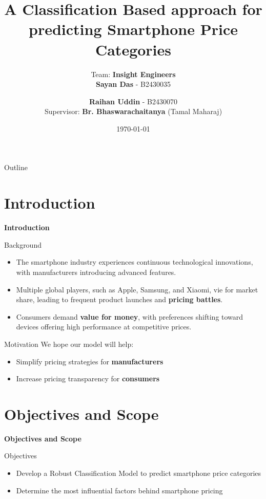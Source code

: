 \documentclass[14pt, aspectratio=169]{beamer}
\title{A Classification Based approach for predicting Smartphone Price Categories}
\author{Team: \textbf{Insight Engineers} \\  \textbf{Sayan Das} - B2430035 \and \textbf{Raihan Uddin} - B2430070 \\ Supervisor: \textbf{Br. Bhaswarachaitanya} (Tamal Maharaj)}
\date{\today}
\begin{document}
\maketitle

\begin{frame}{Outline}
  \tableofcontents
\end{frame}



\section{Introduction}
\begin{frame}{}
  \Huge
  \centering
  \textbf{Introduction}
  \normalsize
\end{frame}
\begin{frame}{Background}
    \begin{itemize}
      \item The smartphone industry experiences continuous technological innovations, with manufacturers introducing advanced features.
      \item Multiple global players, such as Apple, Samsung, and Xiaomi, vie for market share, leading to frequent product launches and \textbf{pricing battles}.
      \item Consumers demand \textbf{value for money}, with preferences shifting toward devices offering high performance at competitive prices.
  \end{itemize}
\end{frame}
\begin{frame}{Motivation}
  We hope our model will help:
  \vspace{1.25em}
  \begin{itemize}
	\setlength\itemsep{1em}
    \item<1-> Simplify pricing strategies for \textbf{manufacturers}
    \item<2-> Increase pricing transparency for \textbf{consumers}
  \end{itemize}
\end{frame}

\section{Objectives and Scope}
\begin{frame}{}
  \Huge
  \centering
  \textbf{Objectives and Scope}
  \normalsize
\end{frame}
\begin{frame}{Objectives}
  \begin{itemize}
	\setlength\itemsep{0.75em}
    \item<1-> Develop a Robust Classification Model to predict smartphone price categories
    \item<2-> Determine the most influential factors behind smartphone pricing
  \end{itemize}
\end{frame}
\end{document}
